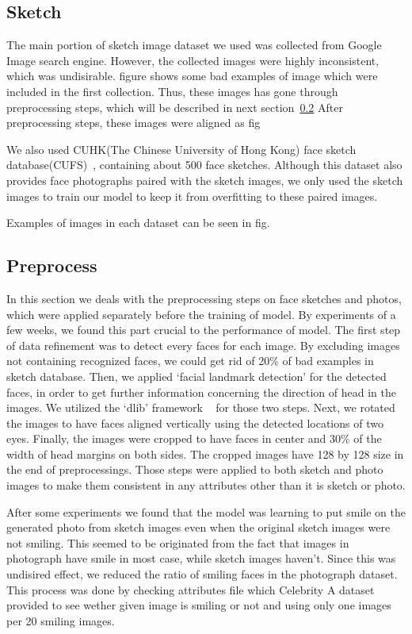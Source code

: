 \subsection{Sketch}

The main portion of sketch image dataset we used was collected from Google Image search engine. However, the collected images were highly inconsistent, which was undisirable. 
figure %
shows some bad examples of image which were included in the first collection. Thus, these images has gone through preprocessing steps, which will be described in next section~\ref{preprocess}
After preprocessing steps, these images were aligned as fig%

We also used CUHK(The Chinese University of Hong Kong) face sketch database(CUFS)~\cite{CUHK_faces}, containing about 500 face sketches. 
Although this dataset also provides face photographs paired with the sketch images, we only used the sketch images to train our model to keep it from overfitting to these paired images.

Examples of images in each dataset can be seen in fig.%

\subsection{Preprocess}\label{preprocess}

In this section we deals with the preprocessing steps on face sketches and photos, which were applied separately before the training of model. By experiments of a few weeks, we found this part crucial to the performance of model. 
The first step of data refinement was to detect every faces for each image. By excluding images not containing recognized faces, we could get rid of 20\% of bad examples in sketch database. Then, we applied `facial landmark detection' for the detected faces, in order to get further information concerning the direction of head in the images. We utilized the `dlib' framework ~\cite{dlib} for those two steps.
Next, we rotated the images to have faces aligned vertically using the detected locations of two eyes.
Finally, the images were cropped to have faces in center and 30\% of the width of head margins on both sides. The cropped images have 128 by 128 size in the end of preprocessings. Those steps were applied to both sketch and photo images to make them consistent in any attributes other than it is sketch or photo. 

After some experiments we found that the model was learning to put smile on the generated photo from sketch images even when the original sketch images were not smiling. This seemed to be originated from the fact that images in photograph have smile in most case, while sketch images haven't. Since this was undisired effect, we reduced the ratio of smiling faces in the photograph dataset. This process was done by checking attributes file which Celebrity A dataset provided to see wether given image is smiling or not and using only one images per 20 smiling images.

\endinput
